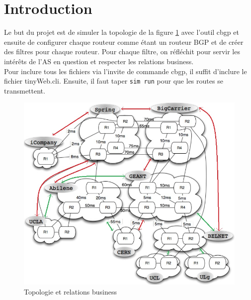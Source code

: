 \documentclass[a4paper, 12pt]{article}
\begin{document}


\section{Introduction}
Le but du projet est de simuler la topologie de la figure \ref{topo} avec l'outil cbgp et ensuite de configurer chaque routeur comme étant un routeur BGP et de créer des filtres pour chaque routeur.
Pour chaque filtre, on réfléchit pour servir les intérêts de l'AS en question et respecter les relations business.
\\

Pour inclure tous les fichiers via l'invite de commande cbgp, il suffit d'inclure le fichier tinyWeb.cli.
Ensuite, il faut taper \texttt{sim run} pour que les routes se transmettent.

\begin{figure}
 \begin{minipage}[c]{.75\linewidth}
  \centering
  \includegraphics[scale=0.65]{businesstiny.jpg}
 \end{minipage}
 \label{topo}
 \caption{Topologie et relations business}
\end{figure}
\end{document}
